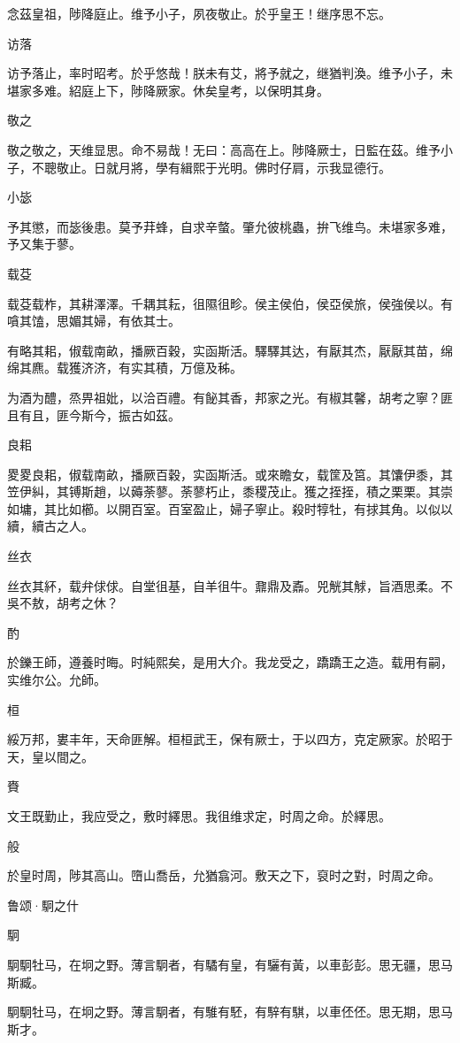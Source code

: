 念茲皇祖，陟降庭止。维予小子，夙夜敬止。於乎皇王！继序思不忘。

访落

访予落止，率时昭考。於乎悠哉！朕未有艾，將予就之，继猶判渙。维予小子，未堪家多难。紹庭上下，陟降厥家。休矣皇考，以保明其身。

敬之

敬之敬之，天维显思。命不易哉！无曰：高高在上。陟降厥士，日監在茲。维予小子，不聰敬止。日就月將，學有緝熙于光明。佛时仔肩，示我显德行。

小毖

予其懲，而毖後患。莫予荓蜂，自求辛螫。肇允彼桃蟲，拚飞维鸟。未堪家多难，予又集于蓼。

载芟

载芟载柞，其耕澤澤。千耦其耘，徂隰徂畛。侯主侯伯，侯亞侯旅，侯強侯以。有嗿其馌，思媚其婦，有依其士。

有略其耜，俶载南畝，播厥百穀，实函斯活。驛驛其达，有厭其杰，厭厭其苗，绵绵其麃。载獲济济，有实其積，万億及秭。

为酒为醴，烝畀祖妣，以洽百禮。有飶其香，邦家之光。有椒其馨，胡考之寧？匪且有且，匪今斯今，振古如茲。

良耜

畟畟良耜，俶载南畝，播厥百穀，实函斯活。或來瞻女，载筐及筥。其馕伊黍，其笠伊糾，其镈斯趙，以薅荼蓼。荼蓼朽止，黍稷茂止。獲之挃挃，積之栗栗。其崇如墉，其比如櫛。以開百室。百室盈止，婦子寧止。殺时犉牡，有捄其角。以似以續，續古之人。

丝衣

丝衣其紑，载弁俅俅。自堂徂基，自羊徂牛。鼐鼎及鼒。兕觥其觩，旨酒思柔。不吳不敖，胡考之休？

酌

於鑠王師，遵養时晦。时純熙矣，是用大介。我龙受之，蹻蹻王之造。载用有嗣，实维尔公。允師。

桓

綏万邦，婁丰年，天命匪解。桓桓武王，保有厥士，于以四方，克定厥家。於昭于天，皇以間之。

賚

文王既勤止，我应受之，敷时繹思。我徂维求定，时周之命。於繹思。

般

於皇时周，陟其高山。嶞山喬岳，允猶翕河。敷天之下，裒时之對，时周之命。




鲁颂·駉之什


駉

駉駉牡马，在坰之野。薄言駉者，有驈有皇，有驪有黃，以車彭彭。思无疆，思马斯臧。

駉駉牡马，在坰之野。薄言駉者，有騅有駓，有騂有騏，以車伾伾。思无期，思马斯才。

